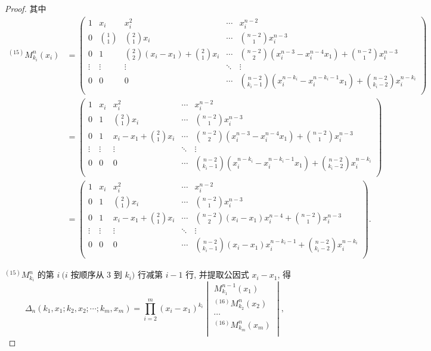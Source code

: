 \documentclass{ctexart}
\begin{document}
\begin{proof}
    其中
    \begin{align*}
        ^{(15)}M_{k_i}^n(x_i) & =\begin{pmatrix}
            1 & x_i & x_i^2 & \cdots & x_i^{n-2} \\[4pt]
            0 & \binom{1}{1} & \binom{2}{1}x_i & \cdots & \binom{n-2}{1}x_i^{n-3} \\[10pt]
            0 & 1 & \binom{2}{2}(x_i-x_1)+\binom{2}{1}x_i & \cdots & \binom{n-2}{2}(x_i^{n-3}-x_i^{n-4}x_1)+\binom{n-2}{1}x_i^{n-3} \\
            \vdots & \vdots & \vdots & \ddots & \vdots \\[4pt]
            0 & 0 & 0 & \cdots & \binom{n-2}{k_i-1}(x_i^{n-k_i}-x_i^{n-k_i-1}x_1)+\binom{n-2}{k_i-2}x_i^{n-k_i} \\
        \end{pmatrix} \\
        & =\begin{pmatrix}
            1 & x_i & x_i^2 & \cdots & x_i^{n-2} \\[4pt]
            0 & 1 & \binom{2}{1}x_i & \cdots & \binom{n-2}{1}x_i^{n-3} \\[10pt]
            0 & 1 & x_i-x_1+\binom{2}{1}x_i & \cdots & \binom{n-2}{2}(x_i^{n-3}-x_i^{n-4}x_1)+\binom{n-2}{1}x_i^{n-3} \\
            \vdots & \vdots & \vdots & \ddots & \vdots \\[4pt]
            0 & 0 & 0 & \cdots & \binom{n-2}{k_i-1}(x_i^{n-k_i}-x_i^{n-k_i-1}x_1)+\binom{n-2}{k_i-2}x_i^{n-k_i} \\
        \end{pmatrix} \\
        & =\begin{pmatrix}
            1 & x_i & x_i^2 & \cdots & x_i^{n-2} \\[4pt]
            0 & 1 & \binom{2}{1}x_i & \cdots & \binom{n-2}{1}x_i^{n-3} \\[10pt]
            0 & 1 & x_i-x_1+\binom{2}{1}x_i & \cdots & \binom{n-2}{2}(x_i-x_1)x_i^{n-4}+\binom{n-2}{1}x_i^{n-3} \\
            \vdots & \vdots & \vdots & \ddots & \vdots \\[4pt]
            0 & 0 & 0 & \cdots & \binom{n-2}{k_i-1}(x_i-x_1)x_i^{n-k_i-1}+\binom{n-2}{k_i-2}x_i^{n-k_i} \\
        \end{pmatrix}.
    \end{align*}

    $^{(15)}M_{k_i}^n$ 的第 $i\ (i$ 按顺序从 $3$ 到 $k_i)$ 行减第 $i-1$ 行, 并提取公因式 $x_i-x_1$, 得
    \[\Delta_n(k_1,x_1;k_2,x_2;\cdots;k_m,x_m)=\prod\limits_{i=2}^m(x_i-x_1)^{k_i}\begin{vmatrix}
        M_{k_1}^{n-1}(x_1) \\
        ^{(16)}M_{k_2}^n(x_2) \\
        \cdots \\
        ^{(16)}M_{k_m}^n(x_m) \\
    \end{vmatrix},\]


\end{proof}
\end{document}
